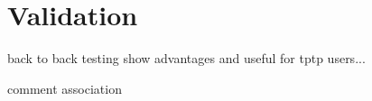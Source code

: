
\chapter{Validation}\label{sec:Validation}
back to back testing
show advantages and useful for tptp users...

comment association